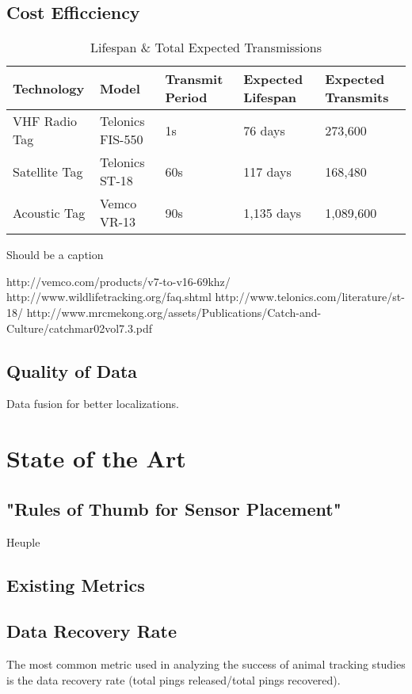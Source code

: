 \subsection{Cost Efficciency}
\begin{table}[h!]
	\caption{Lifespan \& Total Expected Transmissions}
	\label{tab:table1}
	\begin{tabular}{l l l l l}
		Technology&Model&Transmit Period&Expected Lifespan&Expected Transmits\\
		\hline
		VHF Radio Tag		& Telonics FIS-550	& 1s	& 76 days	    & 273,600\\
		Satellite Tag		& Telonics ST-18	& 60s	& 117 days		& 168,480\\
		Acoustic Tag		& Vemco VR-13		& 90s	& 1,135 days	& 1,089,600\\
	\end{tabular}
\begin{center}
Should be a caption
\end{center}
\end{table}

http://vemco.com/products/v7-to-v16-69khz/
http://www.wildlifetracking.org/faq.shtml
http://www.telonics.com/literature/st-18/
http://www.mrcmekong.org/assets/Publications/Catch-and-Culture/catchmar02vol7.3.pdf
\subsection{Quality of Data}
Data fusion for better localizations.









\section{State of the Art}

\subsection{"Rules of Thumb for Sensor Placement"}
Heuple 

\subsection{Existing Metrics}
\subsection{Data Recovery Rate}
The most common metric used in analyzing the success of animal tracking studies is the data recovery rate (total pings released/total pings recovered).    

